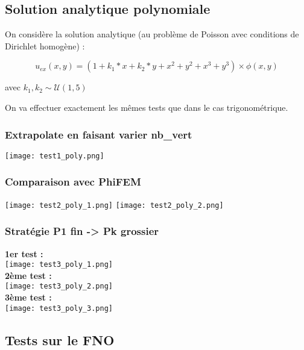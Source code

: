 \subsection{Solution analytique polynomiale}

On considère la solution analytique (au problème de Poisson avec conditions de Dirichlet homogène) :

$$u_{ex}(x,y) = (1+k_1*x+k_2*y+x^2+y^2+x^3+y^3)\times\phi(x,y)$$

avec $k_1,k_2\sim\mathcal{U}(1,5)$

On va effectuer exactement les mêmes tests que dans le cas trigonométrique.

\subsubsection*{Extrapolate en faisant varier nb\_vert}

\begin{minipage}{\linewidth}
	\centering
	\texttt{[image: test1\_poly.png]}
\end{minipage}

\begin{minipage}{0.48\linewidth}
	\centering
	\subsubsection*{Comparaison avec PhiFEM}
	\texttt{[image: test2\_poly\_1.png]}
	\texttt{[image: test2\_poly\_2.png]}
\end{minipage}
\begin{minipage}{0.48\linewidth}

	\centering
	\subsubsection*{Stratégie P1 fin -> Pk grossier}
	\textbf{1er test :} \\
	\texttt{[image: test3\_poly\_1.png]} \\
	\textbf{2ème test :} \\
	\texttt{[image: test3\_poly\_2.png]} \\
	\textbf{3ème test :} \\
	\texttt{[image: test3\_poly\_3.png]} 
\end{minipage}

\subsection{Tests sur le FNO}

